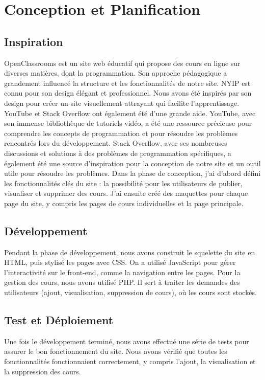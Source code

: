 \documentclass{article}
\begin{document}
\section{Conception et Planification}
\subsection*{Inspiration}

OpenClassrooms est un site web éducatif qui propose des cours en ligne sur diverses matières, dont la programmation. Son approche pédagogique a grandement influencé la structure et les fonctionnalités de notre site.
NYIP est connu pour son design élégant et professionnel. Nous avons été inspirés par son design pour créer un site visuellement attrayant qui facilite l'apprentissage.
YouTube et Stack Overflow ont également été d'une grande aide. YouTube, avec son immense bibliothèque de tutoriels vidéo, a été une ressource précieuse pour comprendre les concepts de programmation et pour résoudre les problèmes rencontrés lors du développement. Stack Overflow, avec ses nombreuses discussions et solutions à des problèmes de programmation spécifiques, a également été une source d'inspiration pour la conception de notre site et un outil utile pour résoudre les problèmes.
Dans la phase de conception, j'ai d'abord défini les fonctionnalités clés du site : la possibilité pour les utilisateurs de publier, visualiser et supprimer des cours. J'ai ensuite créé des maquettes pour chaque page du site, y compris les pages de cours individuelles et la page principale.

\subsection*{Développement}

Pendant la phase de développement, nous avons construit le squelette du site en HTML, puis stylisé les pages avec CSS. On a utilisé JavaScript pour gérer l'interactivité sur le front-end, comme la navigation entre les pages.
Pour la gestion des cours, nous avons utilisé PHP. Il sert à traiter les demandes des utilisateurs (ajout, visualisation, suppression de cours), où les cours sont stockés.

\subsection*{Test et Déploiement}

Une fois le développement terminé, nous avons effectué une série de tests pour assurer le bon fonctionnement du site. Nous avons vérifié que toutes les fonctionnalités fonctionnaient correctement, y compris l'ajout, la visualisation et la suppression des cours.
\end{document}

